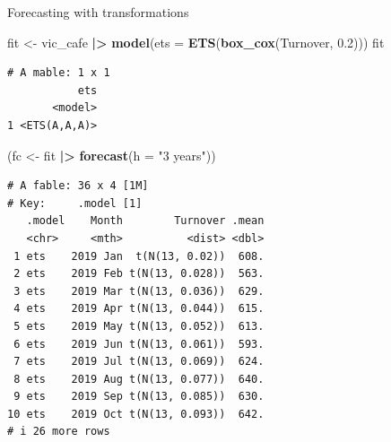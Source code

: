 \documentclass[
  14pt,
  ignorenonframetext,
  aspectratio=169,
]{beamer}
\newenvironment{Shaded}{\begin{snugshade}}{\end{snugshade}}
\newcommand{\AttributeTok}[1]{\textcolor[rgb]{0.13,0.29,0.53}{#1}}
\newcommand{\FloatTok}[1]{\textcolor[rgb]{0.00,0.00,0.81}{#1}}
\newcommand{\FunctionTok}[1]{\textcolor[rgb]{0.13,0.29,0.53}{\textbf{#1}}}
\newcommand{\NormalTok}[1]{#1}
\newcommand{\OtherTok}[1]{\textcolor[rgb]{0.56,0.35,0.01}{#1}}
\newcommand{\SpecialCharTok}[1]{\textcolor[rgb]{0.81,0.36,0.00}{\textbf{#1}}}
\newcommand{\StringTok}[1]{\textcolor[rgb]{0.31,0.60,0.02}{#1}}
\renewenvironment{Shaded}{\vspace*{0.15cm}\color{black}\fontsize{10}{10}\sf\begin{snugshade}\color{black}}{\end{snugshade}}
\begin{document}
\begin{frame}[fragile]{Forecasting with transformations}
\protect{}\label{forecasting-with-transformations-1}
\fontsize{8.8}{9}\sf

\begin{Shaded}
\begin{Highlighting}[]
\NormalTok{fit }\OtherTok{\textless{}{-}}\NormalTok{ vic\_cafe }\SpecialCharTok{|\textgreater{}}
  \FunctionTok{model}\NormalTok{(}\AttributeTok{ets =} \FunctionTok{ETS}\NormalTok{(}\FunctionTok{box\_cox}\NormalTok{(Turnover, }\FloatTok{0.2}\NormalTok{)))}
\NormalTok{fit}
\end{Highlighting}
\end{Shaded}

\begin{verbatim}
# A mable: 1 x 1
           ets
       <model>
1 <ETS(A,A,A)>
\end{verbatim}

\begin{Shaded}
\begin{Highlighting}[]
\NormalTok{(fc }\OtherTok{\textless{}{-}}\NormalTok{ fit }\SpecialCharTok{|\textgreater{}} \FunctionTok{forecast}\NormalTok{(}\AttributeTok{h =} \StringTok{"3 years"}\NormalTok{))}
\end{Highlighting}
\end{Shaded}

\begin{verbatim}
# A fable: 36 x 4 [1M]
# Key:     .model [1]
   .model    Month        Turnover .mean
   <chr>     <mth>          <dist> <dbl>
 1 ets    2019 Jan  t(N(13, 0.02))  608.
 2 ets    2019 Feb t(N(13, 0.028))  563.
 3 ets    2019 Mar t(N(13, 0.036))  629.
 4 ets    2019 Apr t(N(13, 0.044))  615.
 5 ets    2019 May t(N(13, 0.052))  613.
 6 ets    2019 Jun t(N(13, 0.061))  593.
 7 ets    2019 Jul t(N(13, 0.069))  624.
 8 ets    2019 Aug t(N(13, 0.077))  640.
 9 ets    2019 Sep t(N(13, 0.085))  630.
10 ets    2019 Oct t(N(13, 0.093))  642.
# i 26 more rows
\end{verbatim}

\end{frame}
\end{document}
